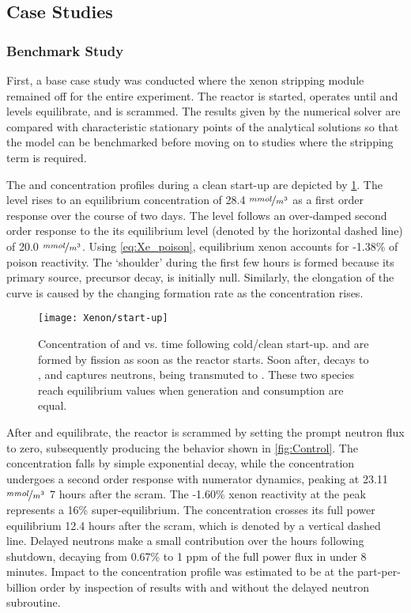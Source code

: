 \subsection{Case Studies}
\subsubsection{Benchmark Study}

First, a base case study was conducted where the xenon stripping module remained off for the entire experiment. The reactor is started, operates until \I and \Xe levels equilibrate, and is scrammed. The results given by the numerical solver are compared with characteristic stationary points of the analytical solutions so that the model can be benchmarked before moving on to studies where the stripping term is required.

The \Xe and \I concentration profiles during a clean start-up are depicted by \cref{fig:startup}. The \I level rises to an equilibrium concentration of 28.4 $\nicefrac{mmol}{m^3}$ as a first order response over the course of two days. The \Xe level follows an over-damped second order response to the its equilibrium level (denoted by the horizontal dashed line) of 20.0 $\nicefrac{mmol}{m^3}$. Using \ref{eq:Xe_poison}, equilibrium xenon accounts for -1.38\% of poison reactivity. The `shoulder' during the first few hours is formed because its primary source, precursor decay, is initially null. Similarly, the elongation of the curve is caused by the changing formation rate as the \I concentration rises. 

\begin{figure}[ht!]
    \centering
    \texttt{[image: Xenon/start-up]}
    \caption[Concentration of \I and \Xe vs. time following start-up]{Concentration of \I and \Xe vs. time following cold/clean start-up. \I and \Xe are formed by fission as soon as the reactor starts. Soon after, \I decays to \Xe, and \Xe captures neutrons, being transmuted to \Xe[136]. These two species reach equilibrium values when generation and consumption are equal.}
    \label{fig:startup}
\end{figure}

After \I and \Xe equilibrate, the reactor is scrammed by setting the prompt neutron flux to zero, subsequently producing the behavior shown in  \cref{fig:Control}. The \I concentration falls by simple exponential decay, while the \Xe concentration undergoes a second order response with numerator dynamics, peaking at 23.11 $\nicefrac{mmol}{m^3}$ 7 hours after the scram. The -1.60\% xenon reactivity at the peak represents a 16\% super-equilibrium. The \Xe concentration crosses its full power equilibrium 12.4 hours after the scram, which is denoted by a vertical dashed line. Delayed neutrons make a small contribution over the hours following shutdown, decaying from 0.67\% to 1 ppm of the full power flux in under 8 minutes. Impact to the \Xe concentration profile was estimated to be at the part-per-billion order by inspection of results with and without the delayed neutron subroutine.

